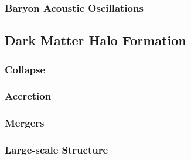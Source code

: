 \subsubsection{Baryon Acoustic Oscillations}
\label{subsubsec:bao}




\subsection{Dark Matter Halo Formation}
\label{subsec:dm_halo_formation}



\subsubsection{Collapse}
\label{subsubsec:collapse}



\subsubsection{Accretion}
\label{subsubsec:accretion}



\subsubsection{Mergers}
\label{subsubsec:mergers}



\subsubsection{Large-scale Structure}
\label{subsubsec:large-scale_structure}





